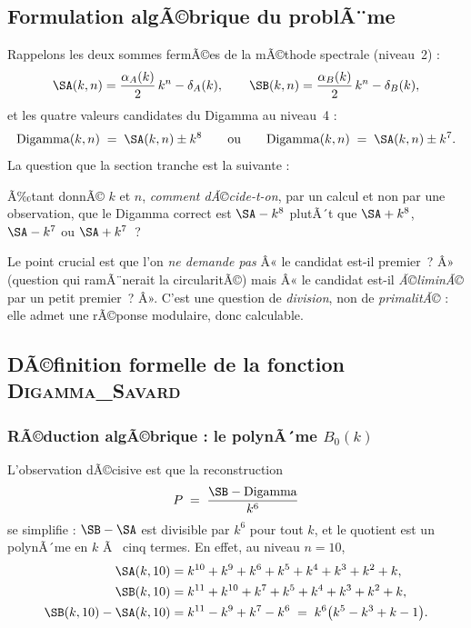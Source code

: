 \subsection{Formulation algÃ©brique du problÃ¨me}

Rappelons les deux sommes fermÃ©es de la mÃ©thode spectrale (niveau~2) :
\[
  \SA(k,n) = \frac{\alpha_A(k)}{2}\,k^{n} - \delta_A(k),
  \qquad
  \SB(k,n) = \frac{\alpha_B(k)}{2}\,k^{n} - \delta_B(k),
\]
et les quatre valeurs candidates du Digamma au niveau~4 :
\[
  \mathrm{Digamma}(k,n) \;=\; \SA(k,n) \pm k^{8}
  \qquad\text{ou}\qquad
  \mathrm{Digamma}(k,n) \;=\; \SA(k,n) \pm k^{7}.
\]
La question que la section tranche est la suivante :

\begin{boiteformule}
Ã‰tant donnÃ© $k$ et $n$, \emph{comment dÃ©cide-t-on}, par un calcul et non
par une observation, que le Digamma correct est $\SA - k^{8}$ plutÃ´t que
$\SA + k^{8}$, $\SA - k^{7}$ ou $\SA + k^{7}$~?
\end{boiteformule}

Le point crucial est que l'on \emph{ne demande pas} Â« le candidat est-il
premier~? Â» (question qui ramÃ¨nerait la circularitÃ©) mais Â« le candidat
est-il \emph{Ã©liminÃ©} par un petit premier~? Â». C'est une question de
\emph{division}, non de \emph{primalitÃ©} : elle admet une rÃ©ponse
modulaire, donc calculable.
\subsection{DÃ©finition formelle de la fonction \textsc{Digamma\_Savard}}

\subsubsection{RÃ©duction algÃ©brique : le polynÃ´me $B_0(k)$}

L'observation dÃ©cisive est que la reconstruction
\[
  P \;=\; \frac{\SB - \mathrm{Digamma}}{k^{6}}
\]
se simplifie : $\SB - \SA$ est divisible par $k^{6}$ pour tout $k$, et le
quotient est un polynÃ´me en $k$ Ã  cinq termes. En effet, au niveau
$n = 10$,
\begin{align*}
  \SA(k,10) &= k^{10}+k^{9}+k^{6}+k^{5}+k^{4}+k^{3}+k^{2}+k,\\
  \SB(k,10) &= k^{11}+k^{10}+k^{7}+k^{5}+k^{4}+k^{3}+k^{2}+k,\\
  \SB(k,10)-\SA(k,10) &= k^{11}-k^{9}+k^{7}-k^{6}
  \;=\; k^{6}\bigl(k^{5}-k^{3}+k-1\bigr).
\end{align*}

